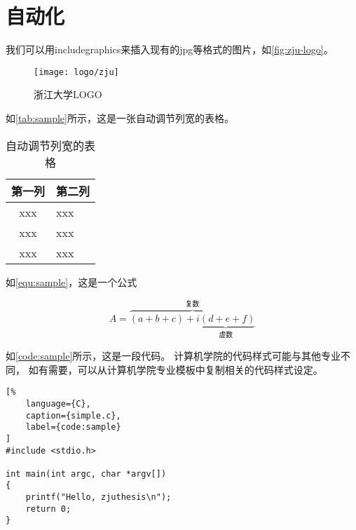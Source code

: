 \cleardoublepage

\section{自动化}


















\par 我们可以用includegraphics来插入现有的jpg等格式的图片，如\autoref{fig:zju-logo}。

\begin{figure}[ht]
    \centering
    \texttt{[image: logo/zju]}
    \caption{\label{fig:zju-logo}浙江大学LOGO}
\end{figure}

\par 如\autoref{tab:sample}所示，这是一张自动调节列宽的表格。

\begin{table}[ht]
    \caption{\label{tab:sample}自动调节列宽的表格}
    \begin{tabularx}{\linewidth}{|c|X<{\centering}|}
        \hline
        第一列 & 第二列 \\ \hline
        xxx & xxx \\ \hline
        xxx & xxx \\ \hline
        xxx & xxx \\ \hline
    \end{tabularx}
\end{table}

\par 如\autoref{equ:sample}，这是一个公式

\begin{equation}
    \label{equ:sample}
    A=\overbrace{(a+b+c)+\underbrace{i(d+e+f)}_{\text{虚数}}}^{\text{复数}}
\end{equation}

\par 如\autoref{code:sample}所示，这是一段代码。
计算机学院的代码样式可能与其他专业不同，
如有需要，可以从计算机学院专业模板中复制相关的代码样式设定。

\begin{lstlisting}[%
    language={C},
    caption={simple.c},
    label={code:sample}
]
#include <stdio.h>

int main(int argc, char *argv[])
{
    printf("Hello, zjuthesis\n");
    return 0;
}
\end{lstlisting}

